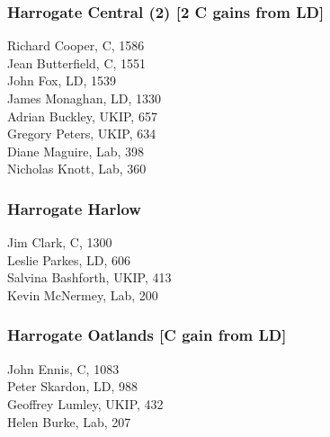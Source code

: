 \documentclass[a4paper,openany,10pt]{book}
\begin{document}
\subsubsection*{Harrogate Central (2) \hspace*{\fill}\nolinebreak[1]%
\enspace\hspace*{\fill}
[2 C gains from LD]}



Richard Cooper, C, 1586\\
Jean Butterfield, C, 1551\\
John Fox, LD, 1539\\
James Monaghan, LD, 1330\\
Adrian Buckley, UKIP, 657\\
Gregory Peters, UKIP, 634\\
Diane Maguire, Lab, 398\\
Nicholas Knott, Lab, 360\\


\subsubsection*{Harrogate Harlow}



Jim Clark, C, 1300\\
Leslie Parkes, LD, 606\\
Salvina Bashforth, UKIP, 413\\
Kevin McNermey, Lab, 200\\


\subsubsection*{Harrogate Oatlands \hspace*{\fill}\nolinebreak[1]%
\enspace\hspace*{\fill}
[C gain from LD]}



John Ennis, C, 1083\\
Peter Skardon, LD, 988\\
Geoffrey Lumley, UKIP, 432\\
Helen Burke, Lab, 207\\
\end{document}
